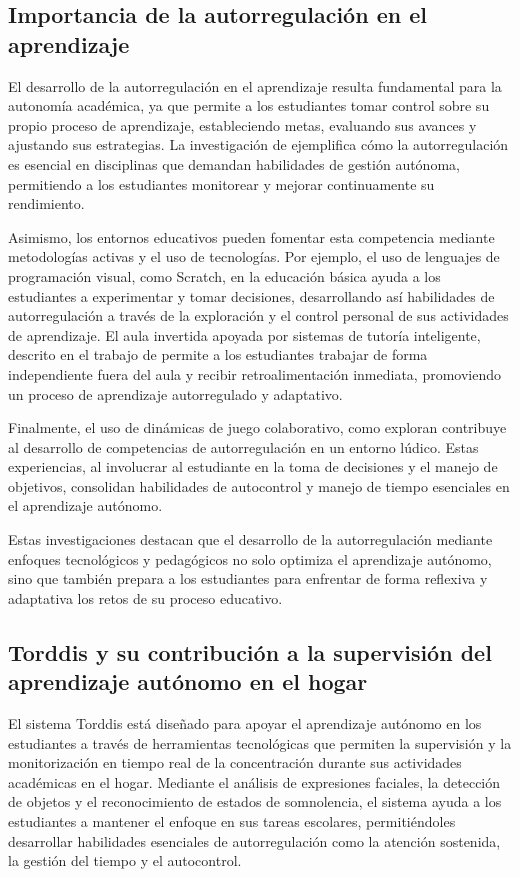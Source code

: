 \documentclass[a4paper,fleqn]{cas-sc}
\begin{document}
	\subsection{Importancia de la autorregulación en el aprendizaje}
	El desarrollo de la autorregulación en el aprendizaje resulta fundamental para la autonomía académica, ya que permite a los estudiantes tomar control sobre su propio proceso de aprendizaje, estableciendo metas, evaluando sus avances y ajustando sus estrategias. La investigación de \cite{Taber2024Developing} ejemplifica cómo la autorregulación es esencial en disciplinas que demandan habilidades de gestión autónoma, permitiendo a los estudiantes monitorear y mejorar continuamente su rendimiento.
	
	Asimismo, los entornos educativos pueden fomentar esta competencia mediante metodologías activas y el uso de tecnologías. Por ejemplo, el uso de lenguajes de programación visual, como Scratch, en la educación básica ayuda a los estudiantes a experimentar y tomar decisiones, desarrollando así habilidades de autorregulación a través de la exploración y el control personal de sus actividades de aprendizaje. El aula invertida apoyada por sistemas de tutoría inteligente, descrito en el trabajo de \cite{Mohamed2018Implementing} permite a los estudiantes trabajar de forma independiente fuera del aula y recibir retroalimentación inmediata, promoviendo un proceso de aprendizaje autorregulado y adaptativo.
	
	Finalmente, el uso de dinámicas de juego colaborativo, como  exploran \cite{Echeverria2011AFramework} contribuye al desarrollo de competencias de autorregulación en un entorno lúdico. Estas experiencias, al involucrar al estudiante en la toma de decisiones y el manejo de objetivos, consolidan habilidades de autocontrol y manejo de tiempo esenciales en el aprendizaje autónomo.
	
	Estas investigaciones destacan que el desarrollo de la autorregulación mediante enfoques tecnológicos y pedagógicos no solo optimiza el aprendizaje autónomo, sino que también prepara a los estudiantes para enfrentar de forma reflexiva y adaptativa los retos de su proceso educativo.
	
	\subsection{Torddis y su contribución a la supervisión del aprendizaje autónomo en el hogar}
	
	El sistema Torddis está diseñado para apoyar el aprendizaje autónomo en los estudiantes a través de herramientas tecnológicas que permiten la supervisión y la monitorización en tiempo real de la concentración durante sus actividades académicas en el hogar. Mediante el análisis de expresiones faciales, la detección de objetos y el reconocimiento de estados de somnolencia, el sistema ayuda a los estudiantes a mantener el enfoque en sus tareas escolares, permitiéndoles desarrollar habilidades esenciales de autorregulación como la atención sostenida, la gestión del tiempo y el autocontrol.
	
\end{document}
